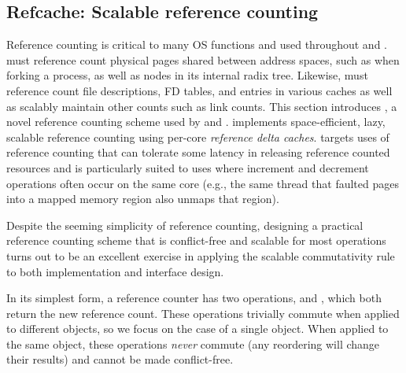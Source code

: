 \subsection{Refcache: Scalable reference counting}

Reference counting is critical to many OS functions and used
throughout \vm and \fs.  \vm must reference count physical pages
shared between address spaces, such as when forking a process, as well
as nodes in its internal radix tree.  Likewise, \fs must reference
count file descriptions, FD tables, and entries in various caches as
well as scalably maintain other counts such as link counts.
%
This section introduces , a novel reference counting scheme
used by \vm and \fs.   implements space-efficient, lazy,
scalable reference counting using per-core \emph{reference delta
  caches}.   targets uses of reference counting that can
tolerate some latency in releasing reference counted resources and is
particularly suited to uses where increment and decrement operations
often occur on the same core (e.g., the same thread that faulted pages
into a mapped memory region also unmaps that region).


Despite the seeming simplicity of reference counting, designing a
practical reference counting scheme that is conflict-free and scalable
for most operations turns out to be an excellent exercise in applying
the scalable commutativity rule to both implementation and interface
design.

In its simplest form, a reference counter has two operations,
 and , which both return the new
reference count.  These operations trivially commute when applied to
different objects, so we focus on the case of a single object.  When
applied to the same object, these operations \emph{never} commute (any
reordering will change their results) and cannot be made
conflict-free.

